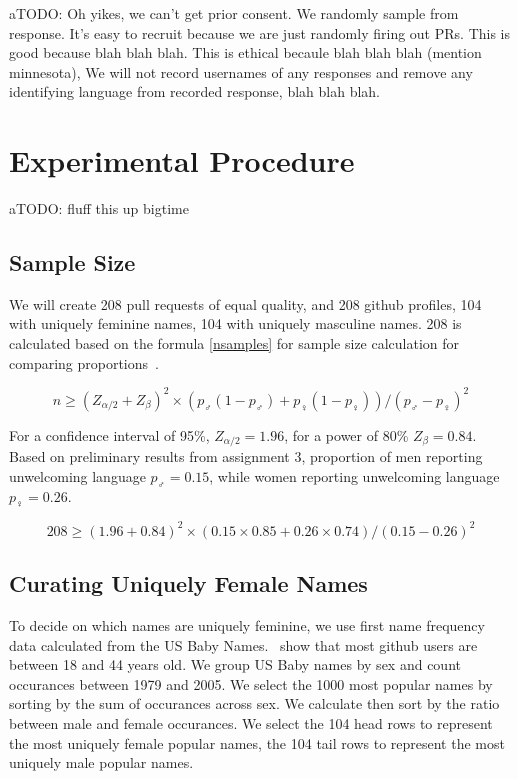 \documentclass[journal,12pt,onecolumn,]{IEEEtran}
\begin{document}
aTODO: Oh yikes, we can't get prior consent. We randomly sample from response. It's easy to recruit because we are just randomly firing out PRs. This is good because blah blah blah. This is ethical becaule blah blah blah (mention minnesota), We will not record usernames of any responses and remove any identifying language from recorded response, blah blah blah.

\section{Experimental Procedure}

aTODO: fluff this up bigtime

\subsection{Sample Size}

We will create 208 pull requests of equal quality, and 208 github profiles, 104 with uniquely feminine names, 104 with uniquely masculine names.
208 is calculated based on the formula \ref{nsamples} for sample size calculation for comparing proportions~\cite{wang2007sample}.

\begin{equation} \label{nsamples}
    n \ge ( Z_{\alpha/2} + Z_{\beta} )^2 \times ( p_{\male} ( 1 - p_{\male} ) + p_{\female} ( 1 - p_{\female})) / ( p_{\male} - p_{\female})^2
\end{equation}

For a confidence interval of 95\%, $Z_{\alpha/2} = 1.96$, for a power of 80\% $Z_{\beta} = 0.84$.
Based on preliminary results from assignment 3, proportion of men reporting unwelcoming language $p_{\male} = 0.15$,
while women reporting unwelcoming language $p_{\female} = 0.26$.

\begin{equation}
    208 \ge (1.96 + 0.84)^2 \times (0.15 \times 0.85 + 0.26 \times 0.74) / (0.15 - 0.26)^2
\end{equation}

\subsection{Curating Uniquely Female Names}

To decide on which names are uniquely feminine, we use first name frequency data calculated from the US Baby Names.~\cite{names}
\citet{geiger17} show that most github users are between 18 and 44 years old.
We group US Baby names by sex and count occurances between 1979 and 2005.
We select the 1000 most popular names by sorting by the sum of occurances across sex.
We calculate then sort by the ratio between male and female occurances.
We select the 104 head rows to represent the most uniquely female popular names, the 104 tail rows to represent the most uniquely male popular names.
\end{document}
